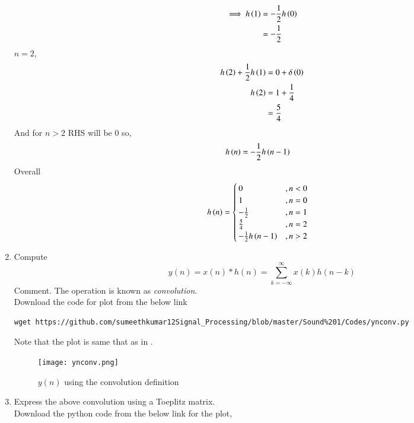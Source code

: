 \documentclass[journal,12pt,twocolumn]{IEEEtran}
\renewcommand\thesection{\arabic{section}}
\begin{document}
\begin{enumerate}[label=\thesection.\arabic*]
\begin{align}
      \implies  h\left(1\right)&= -\frac{1}{2}h\left(0\right)\\
                         &= -\frac{1}{2}
     \end{align}
    $n=2$,
      \begin{align}
        h\left(2\right) + \frac{1}{2}h\left(1\right) &= 0 + \delta\left(0\right)\\
              h\left(2\right) &= 1 + \frac{1}{4}\\
                        &= \frac{5}{4}
      \end{align}
    And for $n>2$ RHS will be $0$ so,
      \begin{align}
        h\left(n\right) &= -\frac{1}{2}h\left(n-1\right)
      \end{align}
    Overall 
      \begin{align}
         h\left(n\right) &= \begin{cases}
                          0  &, n <0 \\
                          1  &, n = 0 \\
                        -\frac{1}{2} &, n=1 \\
                        \frac{5}{4} &, n =2\\
                        -\frac{1}{2}h\left(n-1\right) &, n >2
         \end{cases}
         \end{align}
        \item Compute 
     \begin{equation}
     \label{eq:convolution}
     y(n) = x(n)*h(n) = \sum_{k=-\infty}^{\infty}x(k)h(n-k)
     \end{equation}
     Comment. The operation  is known as
     {\em convolution}.\\
     \solution Download the code for plot from the below link
      \begin{lstlisting}
wget https://github.com/sumeethkumar12Signal_Processing/blob/master/Sound%201/Codes/ynconv.py
      \end{lstlisting}
      Note that the plot is same that as in .
      \begin{figure}[ht!]
        \centering
        \texttt{[image: ynconv.png]}
        \caption{$y(n)$ using the convolution definition}
        \label{ynconv}
      \end{figure}
    \item Express the above convolution using a Toeplitz matrix.\\
    \solution Download the python code from the below link for the plot,

\end{enumerate}
\end{document}
